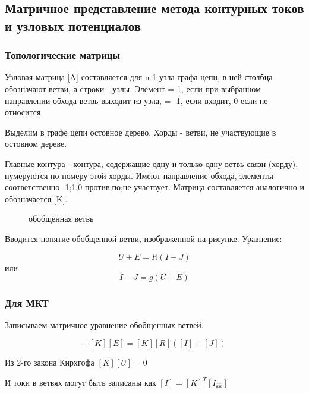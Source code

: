 \subsection{Матричное представление метода контурных токов и узловых потенциалов}

\subsubsection{Топологические матрицы}

Узловая матрица [A] составляется для n-1 узла графа цепи, в ней столбца обозначают ветви, а строки - узлы.
Элемент = 1, если при выбранном направлении обхода ветвь выходит из узла, = -1, если входит, 0 если не относится.




Выделим в графе цепи остовное дерево. Хорды - ветви, не участвующие в остовном дереве.

Главные контура - контура, содержащие одну и только одну ветвь связи (хорду), нумеруются по номеру этой хорды.
Имеют направление обхода, элементы соответственно -1;1;0   против;по;не участвует. Матрица составляется аналогично и обозначается [K].
\begin{center}
	\begin{figure}[h!]
		\caption{обобщенная ветвь}	
	\end{figure}
\end{center}	


Вводится понятие обобщенной ветви, изображенной на рисунке.
Уравнение:

\begin{equation}
U+E=R(I+J)
\end{equation}
или
\begin{equation}
I+J=g(U+E)
\end{equation}

\subsubsection{Для МКТ}

Записываем матричное уравнение обобщенных ветвей.


\begin{equation}
[K][U]+[K][E]=[K][R] ([I]+[J])
\end{equation}

Из 2-го закона Кирхгофа $[K][U]=0$


И токи в ветвях могут быть записаны как $[I]=[K]^T[I_{kk}]$ 

